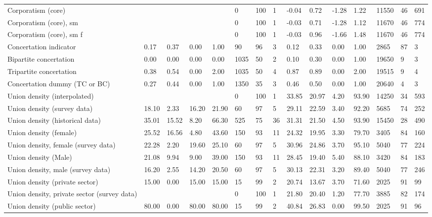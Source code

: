 \begin{longtable}{lllllllllllllll}
Corporatism (core) &  &  &  &  & 0 & 100 & 1 & -0.04 & 0.72 & -1.28 & 1.22 & 11550 & 46 & 691\\
\addlinespace
Corporatism (core), sm &  &  &  &  & 0 & 100 & 1 & -0.03 & 0.71 & -1.28 & 1.12 & 11670 & 46 & 774\\
Corporatism (core), sm f &  &  &  &  & 0 & 100 & 1 & -0.03 & 0.96 & -1.66 & 1.48 & 11670 & 46 & 774\\
Concertation indicator & 0.17 & 0.37 & 0.00 & 1.00 & 90 & 96 & 3 & 0.12 & 0.33 & 0.00 & 1.00 & 2865 & 87 & 3\\
Bipartite concertation & 0.00 & 0.00 & 0.00 & 0.00 & 1035 & 50 & 2 & 0.10 & 0.30 & 0.00 & 1.00 & 19650 & 9 & 3\\
Tripartite concertation & 0.38 & 0.54 & 0.00 & 2.00 & 1035 & 50 & 4 & 0.87 & 0.89 & 0.00 & 2.00 & 19515 & 9 & 4\\
\addlinespace
Concertation dummy (TC or BC) & 0.27 & 0.44 & 0.00 & 1.00 & 1350 & 35 & 3 & 0.46 & 0.50 & 0.00 & 1.00 & 20640 & 4 & 3\\
Union density (interpolated) &  &  &  &  & 0 & 100 & 1 & 33.85 & 20.97 & 4.20 & 93.90 & 14250 & 34 & 593\\
Union density (survey data) & 18.10 & 2.33 & 16.20 & 21.90 & 60 & 97 & 5 & 29.11 & 22.59 & 3.40 & 92.20 & 5685 & 74 & 252\\
Union density (historical data) & 35.01 & 15.52 & 8.20 & 66.30 & 525 & 75 & 36 & 31.31 & 21.50 & 4.50 & 93.90 & 15450 & 28 & 490\\
Union density (female) & 25.52 & 16.56 & 4.80 & 43.60 & 150 & 93 & 11 & 24.32 & 19.95 & 3.30 & 79.70 & 3405 & 84 & 160\\
\addlinespace
Union density, female (survey data) & 22.28 & 2.20 & 19.60 & 25.10 & 60 & 97 & 5 & 30.96 & 24.86 & 3.70 & 95.10 & 5040 & 77 & 224\\
Union density (Male) & 21.08 & 9.94 & 9.00 & 39.00 & 150 & 93 & 11 & 28.45 & 19.40 & 5.40 & 88.10 & 3420 & 84 & 183\\
Union density, male (survey data) & 16.20 & 2.55 & 14.20 & 20.50 & 60 & 97 & 5 & 30.13 & 22.31 & 3.20 & 89.40 & 5040 & 77 & 246\\
Union density (private sector) & 15.00 & 0.00 & 15.00 & 15.00 & 15 & 99 & 2 & 20.74 & 13.67 & 3.70 & 71.60 & 2025 & 91 & 99\\
Union density, private sector (survey data) &  &  &  &  & 0 & 100 & 1 & 21.80 & 20.40 & 1.20 & 77.70 & 3885 & 82 & 174\\
\addlinespace
Union density (public sector) & 80.00 & 0.00 & 80.00 & 80.00 & 15 & 99 & 2 & 40.84 & 26.83 & 0.00 & 99.50 & 2025 & 91 & 96\\

\end{longtable}
